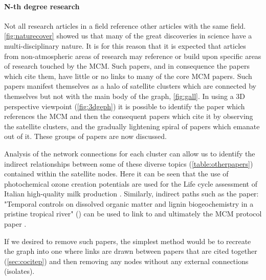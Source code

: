 \paragraph*{N-th degree research}
Not all research articles in a field reference other articles with the same field. \autoref{fig:naturecover} showed us that many of the great discoveries in science have a multi-disciplinary nature. It is for this reason that it is expected that articles from non-atmospheric areas of research may reference or build upon specific areas of research touched by the MCM. Such papers, and in consequence the papers which cite them, have little or no links to many of the core MCM papers. Such papers manifest themselves as a halo of satellite clusters which are connected by themselves but not with the main body of the graph, \autoref{fig:gall}. In using a 3D perspective viewpoint (\autoref{fig:3dgeph}) it is possible to identify the paper which references the MCM and then the consequent papers which cite it by observing the satellite clusters, and the gradually lightening spiral of papers which emanate out of it. These groups of papers are now discussed.

Analysis of the network connections for each cluster can allow us to identify the indirect relationships between some of these diverse topics (\autoref{table:otherpapers}) contained within the satellite nodes. Here it can be seen that the use of photochemical ozone creation potentials \citep{milk1,milk2} are used for the Life cycle assessment of Italian high-quality milk production \citep{milk}.
Similarly, indirect paths such as the paper:
 "Temporal controls on dissolved organic matter and lignin biogeochemistry in a pristine tropical river" (\citep{biogeo}) can be used to link to \citep{georiver1} and ultimately the MCM protocol paper \citep{mcmpartA}.

 If we desired to remove such papers, the simplest method would be to recreate the graph into one where links are drawn between papers that are cited together (\autoref{sec:cocitep})
 and then removing any nodes without any external connections (isolates).

